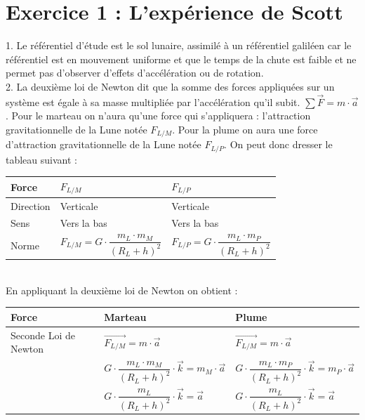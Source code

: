 \documentclass[a4paper,11pt,fleqn]{article}%
\begin{document}
\maketitle

\section*{Exercice 1 : L'expérience de Scott}
1. Le référentiel d'étude est le sol lunaire, assimilé à un référentiel galiléen car le référentiel est en mouvement uniforme et que le temps de la chute est faible et ne permet pas d'observer d'effets d'accélération ou de rotation.\\
2. La deuxième loi de Newton dit que la somme des forces appliquées sur un système est égale à sa masse multipliée par l'accélération qu'il subit. $\sum \vec{F} = m \cdot \vec{a}$. Pour le marteau on n'aura qu'une force qui s'appliquera : l'attraction gravitationnelle de la Lune notée $F_{L/M}$. Pour la plume on aura une force d'attraction gravitationnelle de la Lune notée $F_{L/P}$. On peut donc dresser le tableau suivant :\\
\begin{tabular}{|>{\centering}m{}|>{\centering}m{}|>{\centering\arraybackslash}m{}|}
\hline
Force & $F_{L/M}$ &$F_{L/P}$\\
\hline
Direction & Verticale & Verticale \\
\hline
Sens & Vers la bas & Vers la bas \\
\hline
Norme & $F_{L/M} = G \cdot \dfrac{m_L \cdot m_M}{(R_L + h)^2}$ &$F_{L/P} = G \cdot \dfrac{m_L \cdot m_P}{(R_L + h)^2}$\\
\hline
\end{tabular}\\

En appliquant la deuxième loi de Newton on obtient :\\

\noindent \begin{tabular}{|>{\centering}m{}|>{\centering}m{}|>{\centering\arraybackslash}m{}|}
\hline
Force & Marteau &Plume\\
\hline
Seconde Loi de Newton & $\vec{F_{L/M}} = m \cdot \vec{a}$ &$\vec{F_{L/M}} = m \cdot \vec{a}$\\
&  $G \cdot \dfrac{m_L \cdot m_M}{(R_L + h)^2} \cdot \vec{k} = m_M \cdot \vec{a}$ &$G \cdot \dfrac{m_L \cdot m_P}{(R_L + h)^2} \cdot \vec{k} = m_P \cdot \vec{a}$\\
&  $G \cdot \dfrac{m_L}{(R_L + h)^2} \cdot \vec{k} = \vec{a}$ &$G \cdot \dfrac{m_L}{(R_L + h)^2} \cdot \vec{k} = \vec{a}$\\
\hline
\end{tabular}\\
\end{document}
